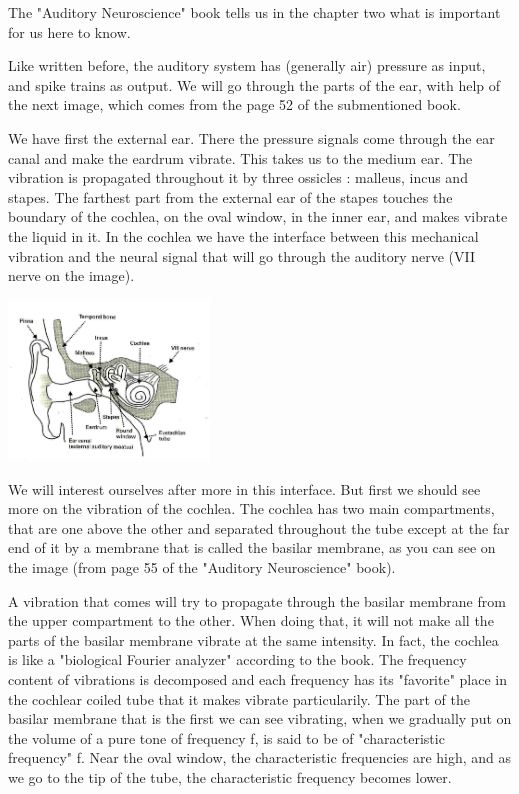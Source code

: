The "Auditory Neuroscience" book \cite{AuditoryNeuroscience} tells us in the 
chapter two what is important for us here to know. 

Like written before, the auditory system has (generally air) pressure as input, 
and spike trains as output. We will go through the parts of the ear, with help 
of the next image, which comes from the page 52 of the submentioned book. 

We have first the external ear. There the pressure signals come through the ear 
canal and make the eardrum vibrate. This takes us to the medium ear. 
The vibration is propagated throughout it by three ossicles : malleus, incus 
and stapes. The farthest part from the external ear of the stapes touches the 
boundary of the cochlea, on the oval window, in the inner ear, and makes vibrate
 the liquid in it. 
In the cochlea we have the interface between this mechanical vibration 
and the neural signal that will go through the auditory nerve 
(VII nerve on the image).

\includegraphics[width=0.4\textwidth]{images/ear-aud52-level.jpg}

We will interest ourselves after more in this interface. But first we should see 
more on the vibration of the cochlea. The cochlea has two main compartments, 
that are one above the other and separated 
throughout the tube except at the far end of it by a membrane that is called 
the basilar membrane, as you can see on the image 
(from page 55 of the "Auditory Neuroscience" book).


A vibration that comes will try to propagate through the basilar membrane from 
the upper compartment to the other. When doing that, it will not make all 
the parts of the basilar membrane vibrate at the same intensity. 
In fact, the cochlea is like a "biological Fourier analyzer" according to the book. 
The frequency content of vibrations is decomposed and each frequency has its 
"favorite" place in the cochlear coiled tube that it makes vibrate particularily. 
The part of the basilar membrane that is the first we can see vibrating, 
when we gradually put on the volume of a pure tone of frequency f, is said to be of 
"characteristic frequency" f. Near the oval window, the characteristic 
frequencies are high, and as we go to the tip of the tube, 
the characteristic frequency becomes lower.

